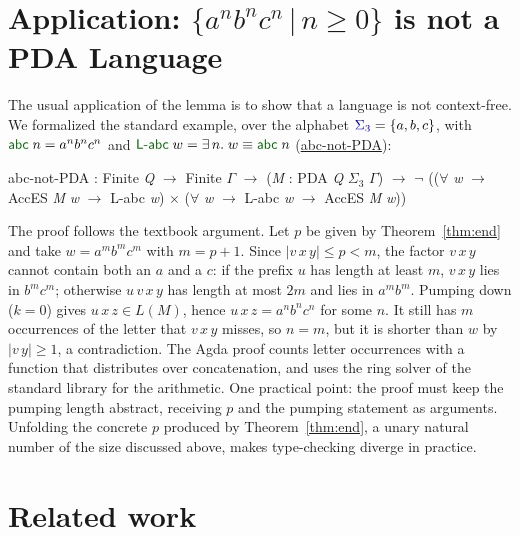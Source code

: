 \documentclass[runningheads]{llncs}
\newcommand{\blueFG}[1]{\textcolor[rgb]{0,0,0.8}{#1}}
\newcommand{\greenFG}[1]{\textcolor[rgb]{0,0.4,0}{#1}}
\newcommand{\purpleFG}[1]{\textcolor[rgb]{0.4,0,0.4}{#1}}
\newcommand{\D}[1]{{\blueFG{\textsf{#1}}}}      %
\newcommand{\F}[1]{{\greenFG{\textsf{#1}}}}     %
\newcommand{\V}[1]{{\purpleFG{\textit{#1}}}}    %
\newcommand{\agdarev}{9ac99a00bb1dc0047eca6ac9ab8f15585acb3577}
\newcommand{\agdarepo}{https://github.com/lives-group/pda-pumping/blob/\agdarev/src}
\newcommand{\agdalink}[3]{\href{\agdarepo/#1\#L#2}{\F{#3}}}
\newcommand{\kto}{\ensuremath{\to}}
\newcommand{\kfa}{\ensuremath{\forall}}
\newcommand{\keq}{\ensuremath{\equiv}}
\newcommand{\ks}[1]{\ensuremath{_{#1}}}
\newcommand{\kSigma}{\ensuremath{\Sigma}}
\newcommand{\kG}{\ensuremath{\Gamma}}   %
\newcommand{\ktimes}{\ensuremath{\times}}
\begin{document}
\section{Application: $\{a^{n}b^{n}c^{n}\,|\,n\geq 0\}$ is not a PDA Language}\label{sec:application}

The usual application of the lemma is to show that a language is not
context-free. We formalized the standard example, over the alphabet
$\D{\kSigma\ks{3}} = \{a,b,c\}$, with $\F{abc}\;n = a^{n}b^{n}c^{n}$ and
$\F{L-abc}\;w = \exists\,n.\; w \keq \F{abc}\;n$
(\agdalink{Examples/ABC.agda}{240}{abc-not-PDA}):
\begin{spec}
\F{abc-not-PDA} : \F{Finite} \V{Q} \kto{} \F{Finite} \V{\kG{}} \kto{} (\V{M} : \D{PDA} \V{Q} \D{\kSigma\ks{3}} \V{\kG{}})
  \kto{} \ensuremath{\neg} ((\kfa{} \V{w} \kto{} \F{AccES} \V{M} \V{w} \kto{} \F{L-abc} \V{w}) \ktimes{} (\kfa{} \V{w} \kto{} \F{L-abc} \V{w} \kto{} \F{AccES} \V{M} \V{w}))
\end{spec}
The proof follows the textbook argument. Let $p$ be given by
Theorem~\ref{thm:end} and take $w = a^{m}b^{m}c^{m}$ with $m = p+1$. Since
$|v\,x\,y| \leq p < m$, the factor $v\,x\,y$ cannot contain both an $a$ and a
$c$: if the prefix $u$ has length at least $m$, $v\,x\,y$ lies in
$b^{m}c^{m}$; otherwise $u\,v\,x\,y$ has length at most $2m$ and lies in
$a^{m}b^{m}$. Pumping down ($k = 0$) gives $u\,x\,z \in L(M)$, hence
$u\,x\,z = a^{n}b^{n}c^{n}$ for some $n$. It still has $m$ occurrences of the
letter that $v\,x\,y$ misses, so $n = m$, but it is shorter than $w$ by
$|v\,y| \geq 1$, a contradiction. The Agda proof counts letter occurrences with a
function that distributes over concatenation, and uses the ring solver of the
standard library for the arithmetic. One practical point: the proof must keep the
pumping length abstract, receiving $p$ and the pumping statement as arguments.
Unfolding the concrete $p$ produced by Theorem~\ref{thm:end}, a unary natural
number of the size discussed above, makes type-checking diverge in practice.

\section{Related work}\label{sec:related}
\end{document}
